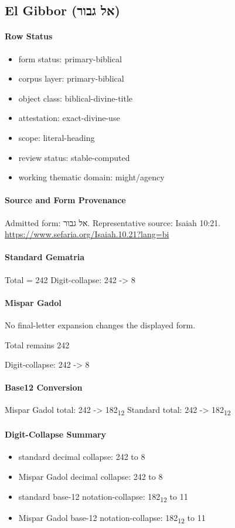 \subsection{El Gibbor (אל גבור)}
\paragraph{Row Status}
\begin{itemize}
\item form status: primary-biblical
\item corpus layer: primary-biblical
\item object class: biblical-divine-title
\item attestation: exact-divine-use
\item scope: literal-heading
\item review status: stable-computed
\item working thematic domain: might/agency
\end{itemize}
\paragraph{Source and Form Provenance}
Admitted form: אל גבור.
Representative source: Isaiah 10:21.
\url{https://www.sefaria.org/Isaiah.10.21?lang=bi}
\paragraph{Standard Gematria}
Total = 242
Digit-collapse: 242 -> 8
\paragraph{Mispar Gadol}
No final-letter expansion changes the displayed form.

Total remains 242

Digit-collapse: 242 -> 8
\paragraph{Base12 Conversion}
Mispar Gadol total: 242 -> 182\textsubscript{12}
Standard total: 242 -> 182\textsubscript{12}
\paragraph{Digit-Collapse Summary}
\begin{itemize}
\item standard decimal collapse: 242 to 8
\item Mispar Gadol decimal collapse: 242 to 8
\item standard base-12 notation-collapse: 182\textsubscript{12} to 11
\item Mispar Gadol base-12 notation-collapse: 182\textsubscript{12} to 11
\end{itemize}
